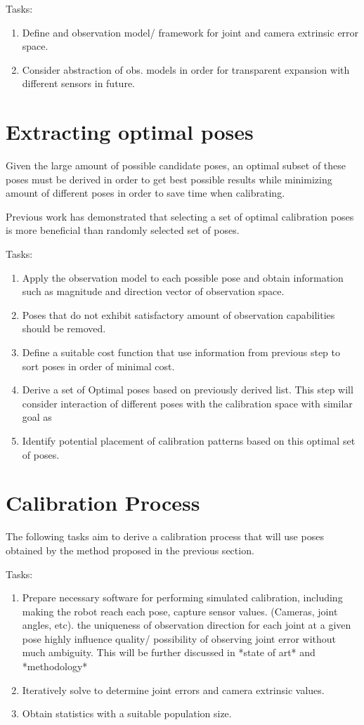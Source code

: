 \documentclass[english, printversion, nomenclature, notitle]{tuvisionthesis} %
\begin{document}
Tasks:
\begin{enumerate}
	\item Define and observation model/ framework for joint and camera extrinsic error space.
	\item Consider abstraction of obs. models in order for transparent expansion with different sensors in future.
\end{enumerate}

\section{Extracting optimal poses}
Given the large amount of possible candidate poses, an optimal subset of these poses must be derived in order to get best possible results while minimizing amount of different poses in order to save time when calibrating.

 Previous work has demonstrated that selecting a set of optimal calibration poses is more beneficial than randomly selected set of poses.

Tasks:
\begin{enumerate}
	\item Apply the observation model to each possible pose and obtain information such as magnitude and direction vector of observation space.
	\item Poses that do not exhibit satisfactory amount of observation capabilities should be removed.
	\item Define a suitable cost function that use information from previous step to sort poses in order of minimal cost.
	\item Derive a set of Optimal poses based on previously derived list. This step will consider interaction of different poses with the calibration space with similar goal as  
	\item Identify potential placement of calibration patterns based on this optimal set of poses.
\end{enumerate}

\section{Calibration Process}
The following tasks aim to derive a calibration process that will use poses obtained by the method proposed in the previous section.

Tasks:
\begin{enumerate}
	\item Prepare necessary software for performing simulated calibration, including making the robot reach each pose, capture sensor values. (Cameras, joint angles, etc).
	\subitem the uniqueness of observation direction for each joint at a given pose highly influence quality/ possibility of observing joint error without much ambiguity. This will be further discussed in *state of art* and *methodology*
	\item Iteratively solve to determine joint errors and camera extrinsic values.
	\item Obtain statistics with a suitable population size.
\end{enumerate}
\end{document}
